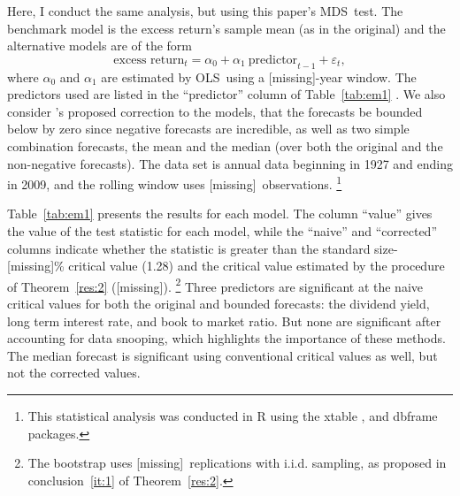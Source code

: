 \documentclass[12pt,fleqn]{article}
\newcommand\citepos[2][]{\citeauthor{#2}'s \citeyearpar[#1]{#2}}
\providecommand\bootsize{[missing]}
\providecommand\empiricalcriticalvalue{[missing]}
\providecommand\nboot{[missing]}
\providecommand\windowlength{[missing]}
\providecommand\empiricaltable{[missing]}
\theoremstyle{definition}
\newcommand{\mds}{MDS}
\newcommand{\ols}{OLS}
\newcommand{\oos}{OOS}
\begin{document}
Here, I conduct the same analysis, but using this paper's \mds\ test.
The benchmark model is the excess return's sample mean (as in the
original) and the alternative models are of the form
\[\text{excess return}_{t} = \alpha_{0} + \alpha_{1}\ 
\text{predictor}_{t-1} + \varepsilon_{t},\] where $\alpha_{0}$ and
$\alpha_{1}$ are estimated by \ols\ using a \windowlength-year window.
The predictors used are listed in the ``predictor'' column of
Table~\ref{tab:em1} \citep[see][for a detailed description of the
variables]{GoW:08}.  We also consider \citepos{CaT:08} proposed
correction to the models, that the forecasts be bounded below by zero
since negative forecasts are incredible, as well as two simple
combination forecasts, the mean and the median (over both the original
and the non-negative forecasts).  The data set is annual data
beginning in 1927 and ending in 2009, and the rolling window uses
\windowlength\ observations.%
\footnote{This statistical analysis was
  conducted in R \citep{R} using the xtable
  \citep[version~1.6-0]{Dah:09}, and dbframe \citep[version
  0.2.7]{Cal:10b} packages.} %

Table~\ref{tab:em1} presents the results for each model.  The column
``value'' gives the value of the test statistic for each model, while
the ``naive'' and ``corrected'' columns indicate whether the statistic
is greater than the standard size-\bootsize\% critical value (1.28)
and the critical value estimated by the procedure of
Theorem~\ref{res:2} (\empiricalcriticalvalue).%
\footnote{The bootstrap
  uses \nboot\ replications with i.i.d. sampling, as proposed in
  conclusion~\ref{it:1} of Theorem~\ref{res:2}.} %
Three predictors are
significant at the naive critical values for both the original and
bounded forecasts: the dividend yield, long term interest rate, and
book to market ratio.  But none are significant after accounting for
data snooping, which highlights the importance of these methods.  The
median forecast is significant using conventional critical values as
well, but not the corrected values.

\begin{table}[tb!]
  \centering
  \empiricaltable
\caption{Results from \oos\ comparison of equity premium prediction
  models; the benchmark is the recursive sample mean of the equity
  premium and each alternative model is a constant and single lag of
  the variable listed in the ``predictor'' column.  The dataset begins
  in 1927 and ends in 2009 and is annual data. The ``value'' column
  lists the value of this paper's \oos\ statistic, the ``naive''
  column indicates whether the statistic is significant at standard
  critical values, and the ``corrected'' column indicates significance
  using the critical values proposed in Theorem~\ref{res:2} that
  account for the number of models.  See Section~\ref{sec:3} for details.}
\label{tab:em1}
\end{table}
\end{document}
